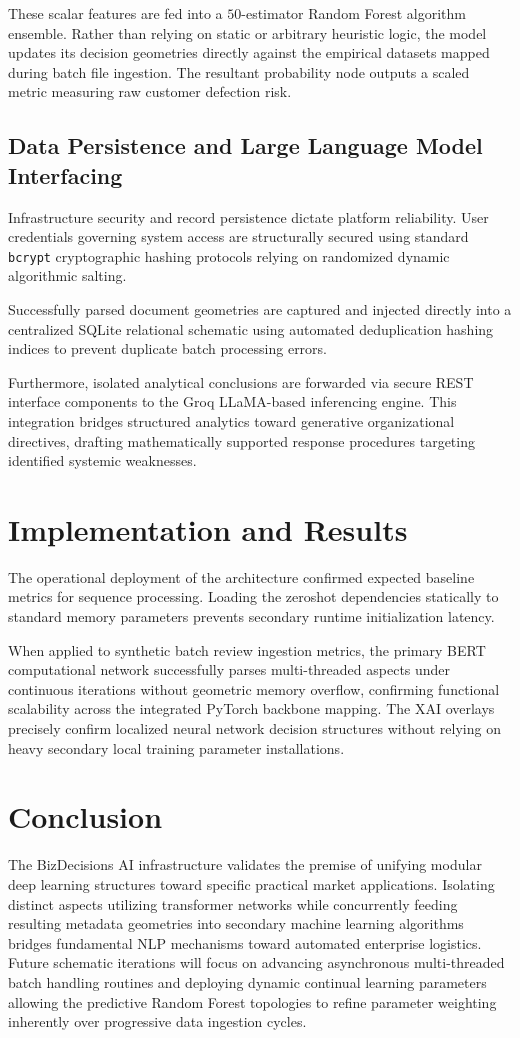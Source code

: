 \documentclass[conference]{IEEEtran}
\begin{document}
These scalar features are fed into a $50$-estimator Random Forest algorithm ensemble. Rather than relying on static or arbitrary heuristic logic, the model updates its decision geometries directly against the empirical datasets mapped during batch file ingestion. The resultant probability node outputs a scaled metric measuring raw customer defection risk.

\subsection{Data Persistence and Large Language Model Interfacing}
Infrastructure security and record persistence dictate platform reliability. User credentials governing system access are structurally secured using standard \texttt{bcrypt} cryptographic hashing protocols relying on randomized dynamic algorithmic salting. 

Successfully parsed document geometries are captured and injected directly into a centralized SQLite relational schematic using automated deduplication hashing indices to prevent duplicate batch processing errors. 

Furthermore, isolated analytical conclusions are forwarded via secure REST interface components to the Groq LLaMA-based inferencing engine. This integration bridges structured analytics toward generative organizational directives, drafting mathematically supported response procedures targeting identified systemic weaknesses.

\section{Implementation and Results}
The operational deployment of the architecture confirmed expected baseline metrics for sequence processing. Loading the zeroshot dependencies statically to standard memory parameters prevents secondary runtime initialization latency. 

When applied to synthetic batch review ingestion metrics, the primary BERT computational network successfully parses multi-threaded aspects under continuous iterations without geometric memory overflow, confirming functional scalability across the integrated PyTorch backbone mapping. The XAI overlays precisely confirm localized neural network decision structures without relying on heavy secondary local training parameter installations.

\section{Conclusion}
The BizDecisions AI infrastructure validates the premise of unifying modular deep learning structures toward specific practical market applications. Isolating distinct aspects utilizing transformer networks while concurrently feeding resulting metadata geometries into secondary machine learning algorithms bridges fundamental NLP mechanisms toward automated enterprise logistics. Future schematic iterations will focus on advancing asynchronous multi-threaded batch handling routines and deploying dynamic continual learning parameters allowing the predictive Random Forest topologies to refine parameter weighting inherently over progressive data ingestion cycles.
\end{document}
